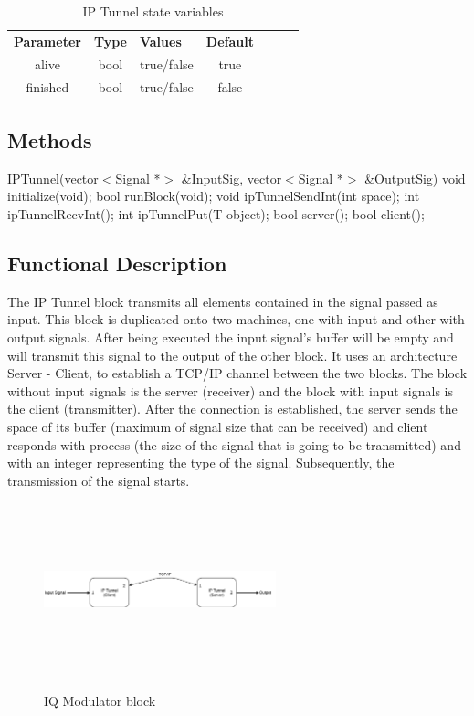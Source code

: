 \begin{table}[h]
	\centering
	\begin{tabular}{|c|c|p{30mm}|c|ccp{60mm}}
		\cline{1-4}
		\textbf{Parameter} & \textbf{Type} & \textbf{Values} &   \textbf{Default}& \\ \cline{1-4}
		alive & bool & true/false & true \\ \cline{1-4}
        finished & bool & true/false & false \\ \cline{1-4}
	
	\end{tabular}
	\caption{IP Tunnel state variables}
	\label{table:iptunnel_st_var}
\end{table}

\subsection*{Methods}
%
IPTunnel(vector$<$Signal *$>$ \&InputSig, vector$<$Signal *$>$ \&OutputSig)
\bigbreak
void initialize(void);
\bigbreak
bool runBlock(void);
\bigbreak
void ipTunnelSendInt(int space);
\bigbreak
int ipTunnelRecvInt();
\bigbreak
int ipTunnelPut(T object);
\bigbreak
bool server();
\bigbreak
bool client();


\subsection*{Functional Description}

The IP Tunnel block transmits all elements contained in the signal passed as input. This block is duplicated onto two machines, one with input and other with output signals. After being executed the input signal's buffer will be empty and will transmit this signal to the output of the other block. It uses an architecture Server - Client, to establish a TCP/IP channel between the two blocks. The block without input signals is the server (receiver) and the block with input signals is the client (transmitter). After the connection is established, the server sends the space of its buffer (maximum of signal size that can be received) and client responds with process (the size of the signal that is going to be transmitted) and with an integer representing the type of the signal. Subsequently, the transmission of the signal starts.

\begin{figure}[h]
	\centering
	\includegraphics[width=0.6\textwidth, height=5cm]{./lib/ip_tunnel/figures/StructureTCPIP.pdf}
	\label{IP Tunnel Block}\caption{IQ Modulator block}
\end{figure}